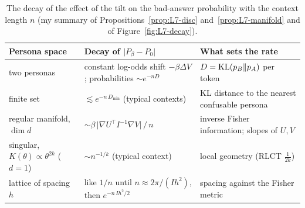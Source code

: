 \begin{table}[tb]
\centering\small
\renewcommand{\arraystretch}{1.28}
\begin{tabular}{@{}>{\raggedright\arraybackslash}p{28mm}>{\raggedright\arraybackslash}p{36mm}>{\raggedright\arraybackslash}p{46mm}@{}}
\toprule
\textbf{Persona space} & \textbf{Decay of $\lvert P_\beta-P_0\rvert$} & \textbf{What sets the rate}\\
\midrule
two personas & constant log-odds shift $-\beta\Delta V$; probabilities $\sim e^{-nD}$ & $D=\operatorname{KL}(p_B\|p_A)$ per token\\
finite set & $\lesssim e^{-n\,D_{\min}}$ (typical contexts) & KL distance to the nearest confusable persona\\
regular manifold, $\dim d$ & $\sim\beta\,\lvert\nabla U^{\top}I^{-1}\nabla V\rvert\,/\,n$ & inverse Fisher information; slopes of $U,V$\\
singular, $K(\theta)\propto\theta^{2k}$ ($d=1$) & $\sim n^{-1/k}$ (typical context) & local geometry (RLCT $\tfrac1{2k}$)\\
lattice of spacing $h$ & like $1/n$ until $n\approx2\pi/(I h^{2})$, then $e^{-n\,Ih^2/2}$ & spacing against the Fisher metric\\
\bottomrule
\end{tabular}
\caption{The decay of the effect of the tilt on the bad-answer probability with the context length $n$ (my summary of Propositions~\ref{prop:L7-disc} and~\ref{prop:L7-manifold} and of Figure~\ref{fig:L7-decay}).}
\label{tab:L7-pred}
\end{table}

